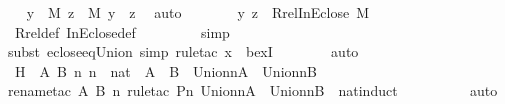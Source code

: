 \begin{isabellebody}
\ \isamarkupfalse%
\ {\isachardoublequoteopen}y\ {\isasymin}\ M{\isachardoublequoteclose}\ {\isachardoublequoteopen}z\ {\isasymin}\ M{\isachardoublequoteclose}\ {\isachardoublequoteopen}y\ {\isasymin}\ z{\isachardoublequoteclose}\ \isamarkupfalse%
\ auto\isanewline
\ \ \ \ \isamarkupfalse%
\ \isamarkupfalse%
\ {\isachardoublequoteopen}{\isacharless}{\kern0pt}y{\isacharcomma}{\kern0pt}\ z{\isachargreater}{\kern0pt}\ {\isasymin}\ Rrel{\isacharparenleft}{\kern0pt}InEclose{\isacharcomma}{\kern0pt}\ M{\isacharparenright}{\kern0pt}{\isachardoublequoteclose}\ \isanewline
\ \ \ \ \ \ \isamarkupfalse%
\ Rrel{\isacharunderscore}{\kern0pt}def\ InEclose{\isacharunderscore}{\kern0pt}def\ \isanewline
\ \ \ \ \ \ \isamarkupfalse%
\ simp\isanewline
\ \ \ \ \ \ \isamarkupfalse%
{\isacharparenleft}{\kern0pt}subst\ eclose{\isacharunderscore}{\kern0pt}eq{\isacharunderscore}{\kern0pt}Union{\isacharcomma}{\kern0pt}\ simp{\isacharcomma}{\kern0pt}\ rule{\isacharunderscore}{\kern0pt}tac\ x{\isacharequal}{\kern0pt}{}\ \ bexI{\isacharparenright}{\kern0pt}\isanewline
\ \ \ \ \ \ \isamarkupfalse%
\ auto\ \isanewline
\ \ \isamarkupfalse%
\ \isanewline
\isanewline
\ \ \ \ \isamarkupfalse%
\ H\ {\isacharcolon}{\kern0pt}\ {\isachardoublequoteopen}{\isasymAnd}A\ B\ n{\isachardot}{\kern0pt}\ n\ {\isasymin}\ nat\ {\isasymLongrightarrow}\ A\ {\isasymsubseteq}\ B\ {\isasymLongrightarrow}\ Union{\isacharcircum}{\kern0pt}n{\isacharparenleft}{\kern0pt}A{\isacharparenright}{\kern0pt}\ {\isasymsubseteq}\ Union{\isacharcircum}{\kern0pt}n{\isacharparenleft}{\kern0pt}B{\isacharparenright}{\kern0pt}{\isachardoublequoteclose}\ \isanewline
\ \ \ \ \ \ \isamarkupfalse%
{\isacharparenleft}{\kern0pt}rename{\isacharunderscore}{\kern0pt}tac\ A\ B\ n{\isacharcomma}{\kern0pt}\ rule{\isacharunderscore}{\kern0pt}tac\ P{\isacharequal}{\kern0pt}{\isachardoublequoteopen}{\isasymlambda}n{\isachardot}{\kern0pt}\ Union{\isacharcircum}{\kern0pt}n{\isacharparenleft}{\kern0pt}A{\isacharparenright}{\kern0pt}\ {\isasymsubseteq}\ Union{\isacharcircum}{\kern0pt}n{\isacharparenleft}{\kern0pt}B{\isacharparenright}{\kern0pt}{\isachardoublequoteclose}\ \ nat{\isacharunderscore}{\kern0pt}induct{\isacharparenright}{\kern0pt}\isanewline
\ \ \ \ \ \ \ \ \isamarkupfalse%
\ auto{\isacharbrackleft}{\kern0pt}{}{\isacharbrackright}{\kern0pt}\isanewline
\ \ \ \ \ \ \isamarkupfalse%

\end{isabellebody}
